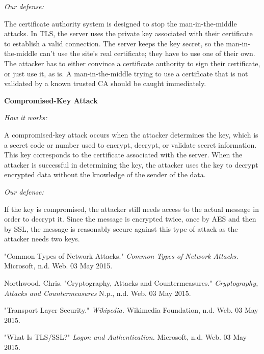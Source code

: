 \documentclass[a4paper,twoside,10pt]{report}
\begin{document}
\vspace{2.5mm}
\noindent
\textit{Our defense: }

The certificate authority system is designed to stop the man-in-the-middle attacks. In TLS, the server uses the private key associated with their certificate to establish a valid connection. The server keeps the key secret, so the man-in-the-middle can’t use the site’s real certificate; they have to use one of their own. The attacker has to either convince a certificate authority to sign their certificate, or just use it, as is. A man-in-the-middle trying to use a certificate that is not validated by a known trusted CA should be caught immediately.


\vspace{2.5mm}
\noindent
{\large\textbf{Compromised-Key Attack}}

\vspace{1mm}
\noindent
\textit{How it works: }

A compromised-key attack occurs when the attacker determines the key, which is a secret code or number used to encrypt, decrypt, or validate secret information. This key corresponds to the certificate associated with the server. When the attacker is successful in determining the key, the attacker uses the key to decrypt encrypted data without the knowledge of the sender of the data. 

\vspace{2.5mm}
\noindent
\textit{Our defense: }

If the key is compromised, the attacker still needs access to the actual message in order to decrypt it. Since the message is encrypted twice, once by AES and then by SSL, the message is reasonably secure against this type of attack as the attacker needs two keys.




\clearpage
{}
\begin{thebibliography}{9}
"Common Types of Network Attacks."
\textit{Common Types of Network Attacks. }
Microsoft, n.d. Web. 03 May 2015.
 
Northwood, Chris.
"Cryptography, Attacks and Countermeasures."
\textit{Cryptography, Attacks and Countermeasures}
N.p., n.d. Web. 03 May 2015.

"Transport Layer Security."
\textit{Wikipedia.} 
 Wikimedia Foundation, n.d. Web. 03 May 2015.

"What Is TLS/SSL?"
\textit{Logon and Authentication.} 
Microsoft, n.d. Web. 03 May 2015.
\end{thebibliography}

\appendix
\end{document}
